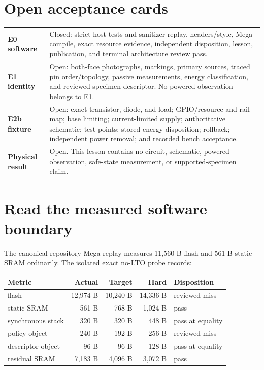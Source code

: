\documentclass[10pt]{article}
\begin{document}
\section{Open acceptance cards}
\begin{tabularx}{\linewidth}{@{}>{\bfseries}l X@{}}
E0 software & Closed: strict host tests and sanitizer replay, headers/style,
Mega compile, exact resource evidence, independent disposition, lesson,
publication, and terminal architecture review pass.\\
E1 identity & Open: both-face photographs, markings, primary sources, traced
pin order/topology, passive measurements, energy classification, and reviewed
specimen descriptor. No powered observation belongs to E1.\\
E2b fixture & Open: exact transistor, diode, and load; GPIO/resource and rail
map; base limiting; current-limited supply; authoritative schematic; test
points; stored-energy disposition; rollback; independent power removal; and
recorded bench acceptance.\\
Physical result & Open. This lesson contains no circuit, schematic, powered
observation, safe-state measurement, or supported-specimen claim.\\
\end{tabularx}

\section{Read the measured software boundary}
The canonical repository Mega replay measures 11,560 B flash and 561 B static
SRAM ordinarily. The isolated exact no-LTO probe records:

\begin{tabularx}{\linewidth}{@{}l r r r X@{}}
\toprule
Metric & Actual & Target & Hard & Disposition\\
\midrule
flash & 12,974 B & 10,240 B & 14,336 B & reviewed miss\\
static SRAM & 561 B & 768 B & 1,024 B & pass\\
synchronous stack & 320 B & 320 B & 448 B & pass at equality\\
policy object & 240 B & 192 B & 256 B & reviewed miss\\
descriptor object & 96 B & 96 B & 128 B & pass at equality\\
residual SRAM & 7,183 B & 4,096 B & 3,072 B & pass\\
\bottomrule
\end{tabularx}
\end{document}
